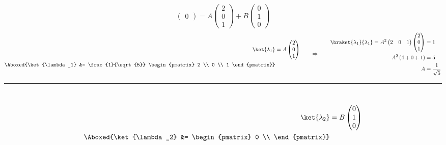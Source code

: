 \documentclass{article}
\begin{document}
\begin{enumerate}
\[\begin{pmatrix}
				0
			\end{pmatrix}
			= A \begin{pmatrix}
				2 \\
				0 \\
				1
			\end{pmatrix} + B \begin{pmatrix}
				0 \\
				1 \\
				0
			\end{pmatrix}
		\]
		\begin{equation*}
			\begin{split}
				\ket{\lambda_1} &= A \begin{pmatrix}
					2 \\
					0 \\
					1
				\end{pmatrix} \\
				\Aboxed{\ket{\lambda_1} &= \frac{1}{\sqrt{5}} \begin{pmatrix}
						2 \\
						0 \\
						1
				\end{pmatrix}}
			\end{split}
			\qquad \Rightarrow \qquad
			\begin{split}
				\braket{\lambda_1}{\lambda_1} = A^2 \begin{pmatrix}
					2 & 0 & 1
				\end{pmatrix}
				\begin{pmatrix}
					2 \\
					0 \\
					1
				\end{pmatrix} &= 1 \\
				A^2 \left( 4 + 0 + 1 \right) &= 5 \\
				A &= \frac{1}{\sqrt{5}}
			\end{split}
		\end{equation*}
		\noindent\hfil\rule{0.5\textwidth}{.4pt}\hfil \\
		\begin{equation*}
			\begin{split}
				\ket{\lambda_2} &= B \begin{pmatrix}
					0 \\
					1 \\
					0
				\end{pmatrix} \\
				\Aboxed{\ket{\lambda_2} &= \begin{pmatrix}
						0 \\

\end{pmatrix}}
\end{split}
\end{equation*}
\end{enumerate}
\end{document}
